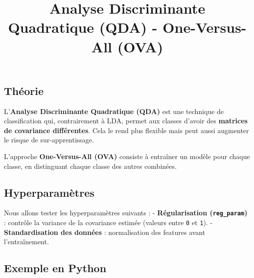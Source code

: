 \documentclass[
  letterpaper,
  DIV=11,
  numbers=noendperiod]{scrartcl}
\title{Analyse Discriminante Quadratique (QDA) - One-Versus-All (OVA)}
\author{}
\date{}
\begin{document}
\maketitle


\subsection{Théorie}\label{thuxe9orie}

L'\textbf{Analyse Discriminante Quadratique (QDA)} est une technique de
classification qui, contrairement à LDA, permet aux classes d'avoir des
\textbf{matrices de covariance différentes}. Cela le rend plus flexible
mais peut aussi augmenter le risque de sur-apprentissage.

L'approche \textbf{One-Versus-All (OVA)} consiste à entraîner un modèle
pour chaque classe, en distinguant chaque classe des autres combinées.

\subsection{Hyperparamètres}\label{hyperparamuxe8tres}

Nous allons tester les hyperparamètres suivants : -
\textbf{Régularisation (\texttt{reg\_param})} : contrôle la variance de
la covariance estimée (valeurs entre \texttt{0} et \texttt{1}). -
\textbf{Standardisation des données} : normalisation des features avant
l'entraînement.

\subsection{Exemple en Python}\label{exemple-en-python}
\end{document}
